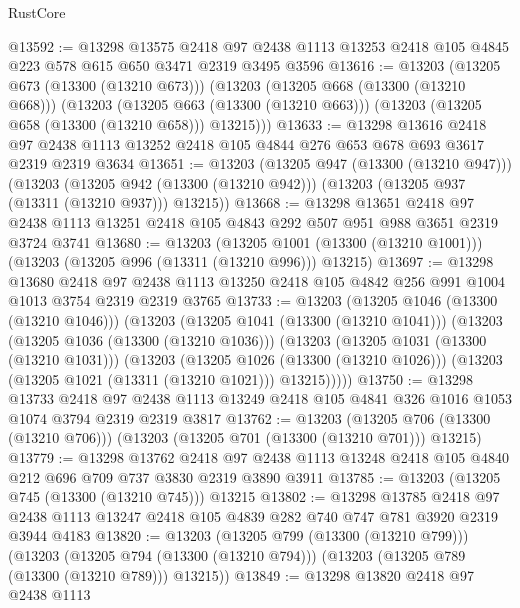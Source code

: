 \begin{lexlean}{RustCore}
\begin{coremodule}
@13592 := @13298
    @13575
    @2418
    @97
    @2438
    @1113
    @13253
    @2418
    @105
    @4845
    @223
    @578
    @615
    @650
    @3471
    @2319
    @3495
    @3596
@13616 := @13203
    (@13205 @673 (@13300 (@13210 @673)))
    (@13203
      (@13205 @668 (@13300 (@13210 @668)))
      (@13203
        (@13205 @663 (@13300 (@13210 @663)))
        (@13203 (@13205 @658 (@13300 (@13210 @658))) @13215)))
@13633 := @13298
    @13616
    @2418
    @97
    @2438
    @1113
    @13252
    @2418
    @105
    @4844
    @276
    @653
    @678
    @693
    @3617
    @2319
    @2319
    @3634
@13651 := @13203
    (@13205 @947 (@13300 (@13210 @947)))
    (@13203
      (@13205 @942 (@13300 (@13210 @942)))
      (@13203 (@13205 @937 (@13311 (@13210 @937))) @13215))
@13668 := @13298
    @13651
    @2418
    @97
    @2438
    @1113
    @13251
    @2418
    @105
    @4843
    @292
    @507
    @951
    @988
    @3651
    @2319
    @3724
    @3741
@13680 := @13203
    (@13205 @1001 (@13300 (@13210 @1001)))
    (@13203 (@13205 @996 (@13311 (@13210 @996))) @13215)
@13697 := @13298
    @13680
    @2418
    @97
    @2438
    @1113
    @13250
    @2418
    @105
    @4842
    @256
    @991
    @1004
    @1013
    @3754
    @2319
    @2319
    @3765
@13733 := @13203
    (@13205 @1046 (@13300 (@13210 @1046)))
    (@13203
      (@13205 @1041 (@13300 (@13210 @1041)))
      (@13203
        (@13205 @1036 (@13300 (@13210 @1036)))
        (@13203
          (@13205 @1031 (@13300 (@13210 @1031)))
          (@13203
            (@13205 @1026 (@13300 (@13210 @1026)))
            (@13203 (@13205 @1021 (@13311 (@13210 @1021))) @13215)))))
@13750 := @13298
    @13733
    @2418
    @97
    @2438
    @1113
    @13249
    @2418
    @105
    @4841
    @326
    @1016
    @1053
    @1074
    @3794
    @2319
    @2319
    @3817
@13762 := @13203
    (@13205 @706 (@13300 (@13210 @706)))
    (@13203 (@13205 @701 (@13300 (@13210 @701))) @13215)
@13779 := @13298
    @13762
    @2418
    @97
    @2438
    @1113
    @13248
    @2418
    @105
    @4840
    @212
    @696
    @709
    @737
    @3830
    @2319
    @3890
    @3911
@13785 := @13203 (@13205 @745 (@13300 (@13210 @745))) @13215
@13802 := @13298
    @13785
    @2418
    @97
    @2438
    @1113
    @13247
    @2418
    @105
    @4839
    @282
    @740
    @747
    @781
    @3920
    @2319
    @3944
    @4183
@13820 := @13203
    (@13205 @799 (@13300 (@13210 @799)))
    (@13203
      (@13205 @794 (@13300 (@13210 @794)))
      (@13203 (@13205 @789 (@13300 (@13210 @789))) @13215))
@13849 := @13298
    @13820
    @2418
    @97
    @2438
    @1113

\end{coremodule}
\end{lexlean}
